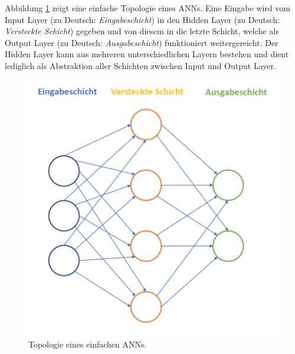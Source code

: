 


Abbildung \ref{fig:basictop} zeigt eine einfache Topologie eines ANNs. Eine Eingabe wird vom Input Layer (zu Deutsch: \textit{Eingabeschicht}) in den Hidden Layer (zu Deutsch: \textit{Versteckte Schicht}) gegeben und von diesem in die letzte Schicht, welche als Output Layer (zu Deutsch: \textit{Ausgabeschicht}) funktioniert weitergereicht. Der Hidden Layer kann aus mehreren unterschiedlichen Layern bestehen und dient lediglich als Abstraktion aller Schichten zwischen Input und Output Layer.

\begin{figure}[ht]
\centering
\includegraphics[scale=0.5]{pictures/grafiken/Folie3}
\caption[Caption for LOF]{Topologie eines einfachen ANNs.} 
\label{fig:basictop}
\end{figure}

